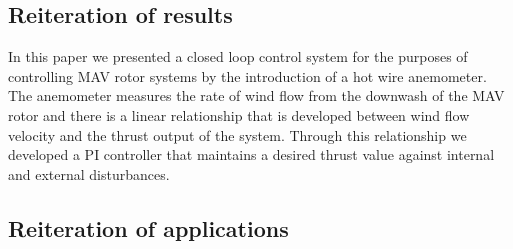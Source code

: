 \documentclass[conference]{IEEEtran}
\begin{document}
\subsection{Reiteration of results}
In this paper we presented a closed loop control system for the purposes of controlling MAV rotor systems by the introduction of a hot wire anemometer. The anemometer measures the rate of wind flow from the downwash of the MAV rotor and there is a linear relationship that is developed between wind flow velocity and the thrust output of the system. Through this relationship we developed a PI controller that maintains a desired thrust value against internal and external disturbances.
\subsection{Reiteration of applications}
\end{document}

